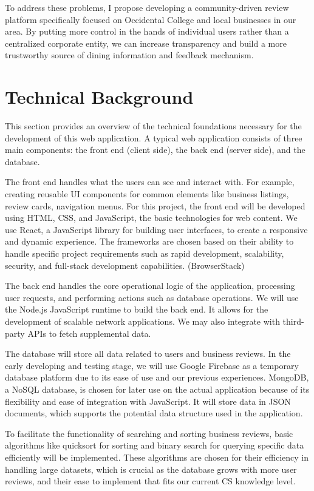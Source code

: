 \documentclass[10pt,twocolumn]{article}
\begin{document}
To address these problems, I propose developing a community-driven review platform specifically focused on Occidental College and local businesses in our area. By putting more control in the hands of individual users rather than a centralized corporate entity, we can increase transparency and build a more trustworthy source of dining information and feedback mechanism.

\section{Technical Background}
This section provides an overview of the technical foundations necessary for the development of this web application. A typical web application consists of three main components: the front end (client side), the back end (server side), and the database. 



The front end handles what the users can see and interact with. For example, creating reusable UI components for common elements like business listings, review cards, navigation menus. For this project, the front end will be developed using HTML, CSS, and JavaScript, the basic technologies for web content. We use React, a JavaScript library for building user interfaces, to create a responsive and dynamic experience. The frameworks are chosen based on their ability to handle specific project requirements such as rapid development, scalability, security, and full-stack development capabilities. (BrowserStack)

The back end handles the core operational logic of the application, processing user requests, and performing actions such as database operations. We will use the Node.js JavaScript runtime to build the back end. It allows for the development of scalable network applications. We may also integrate with third-party APIs to fetch supplemental data.

The database will store all data related to users and business reviews. In the early developing and testing stage, we will use Google Firebase as a temporary database platform due to its ease of use and our previous experiences. MongoDB, a NoSQL database, is chosen for later use on the actual application because of its flexibility and ease of integration with JavaScript. It will store data in JSON documents, which supports the potential data structure used in the application.

To facilitate the functionality of searching and sorting business reviews, basic algorithms like quicksort for sorting and binary search for querying specific data efficiently will be implemented. These algorithms are chosen for their efficiency in handling large datasets, which is crucial as the database grows with more user reviews, and their ease to implement that fits our current CS knowledge level.
\end{document}
